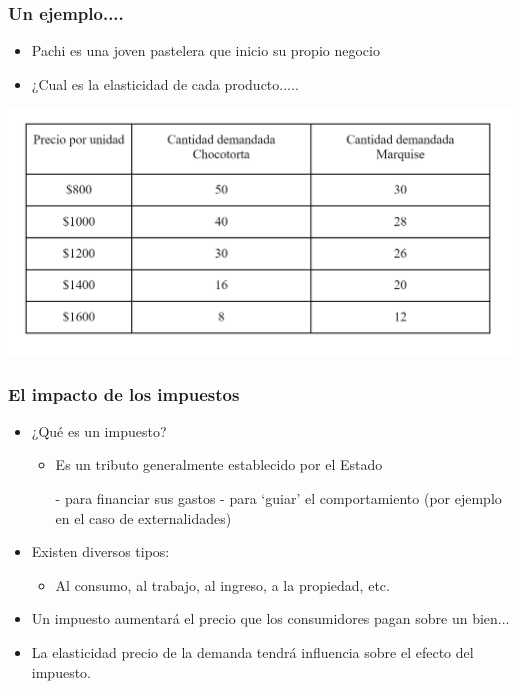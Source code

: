 \documentclass{beamer}
\begin{document}
\begin{frame}
\frametitle{Un ejemplo....}
\begin{itemize}
    \item Pachi es una joven pastelera que inicio su propio negocio\vspace{2mm}
    \item ¿Cual es la elasticidad de cada producto.....
    \end{itemize}
\centering
\includegraphics[scale=0.6]{Slides Principios de Economia/Figures/Pachi.png}
\end{frame}

\begin{frame}
\frametitle{El impacto de los impuestos}
\begin{itemize}
    \item ¿Qué es un impuesto?\vspace{2mm}
    \begin{itemize}
        \item Es un tributo generalmente establecido por el Estado 
       \begin{itemize} 
        - para financiar sus gastos
        - para ‘guiar’ el comportamiento (por ejemplo en el caso de externalidades)\vspace{4mm}
        \end{itemize}   
    \end{itemize}
    \item Existen diversos tipos:\vspace{2mm}
    \begin{itemize}
        \item Al consumo, al trabajo, al ingreso, a la propiedad, etc.
    \end{itemize}\vspace{4mm}
    \item Un impuesto aumentará el precio que los consumidores pagan sobre un bien...\vspace{4mm}
    \item La elasticidad precio de la demanda tendrá influencia sobre el efecto del impuesto.
\end{itemize}
\end{frame}
\end{document}

